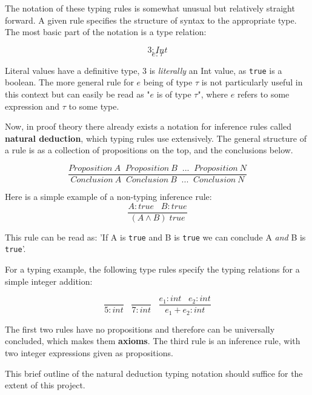 \documentclass{l4proj}
\begin{document}
The notation of these typing rules is somewhat unusual but relatively straight forward.
A given rule specifies the structure of syntax to the appropriate type.
The most basic part of the notation is a type relation:

\[3 : Int\]
\[e : \tau\]

Literal values have a definitive type, $3$ is \emph{literally} an Int value, as \texttt{true} is a boolean.
The more general rule for $e$ being of type $\tau$ is not particularly useful in this context but can easily be read as "$e$ is of type $\tau$", where $e$ refers to some expression and $\tau$ to some type.

Now, in proof theory there already exists a notation for inference rules called \textbf{natural deduction}, which typing rules use extensively.
The general structure of a rule is as a collection of propositions on the top, and the conclusions below.

\begin{equation} \label{eq:inference-syntax-example}
\frac{Proposition\: A \;\; Proposition\: B \;\; ... \;\; Proposition\: N}{Conclusion\: A \;\; Conclusion\: B \;\; ... \;\; Conclusion\: N}
\end{equation}

Here is a simple example of a non-typing inference rule:
\begin{equation} \label{eq:inference-example}
\frac{A : true \;\;\; B : true}{(A \wedge B) \; true}
\end{equation}

This rule can be read as: 'If A is \texttt{true} and B is \texttt{true} we can conclude A \emph{and} B is \texttt{true}'.

For a typing example, the following type rules specify the typing relations for a simple integer addition:

\begin{equation} \label{eq:add-type-rule}
\frac{}{5 : int} \;\;\; \frac{}{7 : int} \;\;\; \frac{e_1 : int \;\;\; e_2 : int}{e_1 + e_2 : int}
\end{equation}

The first two rules have no propositions and therefore can be universally concluded, which makes them \textbf{axioms}.
The third rule is an inference rule, with two integer expressions given as propositions.

This brief outline of the natural deduction typing notation should suffice for the extent of this project. 

\end{document}
